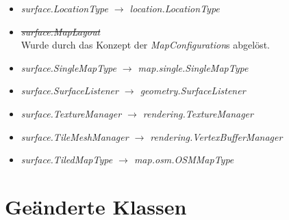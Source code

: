 \documentclass[10pt]{scrreprt}
\begin{document}
\begin{itemize}
\item \textit{surface.LocationType $\rightarrow$ location.LocationType}
\item \textit{\sout{surface.MapLayout}}\\
Wurde durch das Konzept der \textit{MapConfiguration}s abgelöst.
\item \textit{surface.SingleMapType $\rightarrow$ map.single.SingleMapType}
\item \textit{surface.SurfaceListener $\rightarrow$ geometry.SurfaceListener}
\item \textit{surface.TextureManager $\rightarrow$ rendering.TextureManager}
\item \textit{surface.TileMeshManager $\rightarrow$ rendering.VertexBufferManager}
\item \textit{surface.TiledMapType $\rightarrow$ map.osm.OSMMapType}
\end{itemize}


\section{Geänderte Klassen}
\end{document}
